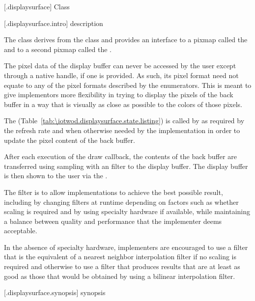 [\iotwod.displaysurface] {Class }

 [\iotwod.displaysurface.intro] { description}

\pnum
{}%
The class  derives from the  class and provides an interface to a pixmap called the  and to a second pixmap called the .

\pnum
The pixel data of the display buffer can never be accessed by the user except through a native handle, if one is provided. As such, its pixel format need not equate to any of the pixel formats described by the  enumerators. This is meant to give implementors more flexibility in trying to display the pixels of the back buffer in a way that is visually as close as possible to the colors of those pixels.

\pnum
The  (Table~\ref{tab:\iotwod.displaysurface.state.listing}) is called by  as required by the refresh rate and when otherwise needed by the implementation in order to update the pixel content of the back buffer.

\pnum
After each execution of the draw callback, the contents of the back buffer are transferred using sampling with an \unspecnorm filter to the display buffer. The display buffer is then shown to the user via the .
\begin{note}
The filter is \unspecnorm to allow implementations to achieve the best possible result, including by changing filters at runtime depending on factors such as whether scaling is required and by using specialty hardware if available, while maintaining a balance between quality and performance that the implementer deems acceptable.

In the absence of specialty hardware, implementers are encouraged to use a filter that is the equivalent of a nearest neighbor interpolation filter if no scaling is required and otherwise to use a filter that produces results that are at least as good as those that would be obtained by using a bilinear interpolation filter.
\end{note}

 [\iotwod.displaysurface.synopsis] { synopsis}

